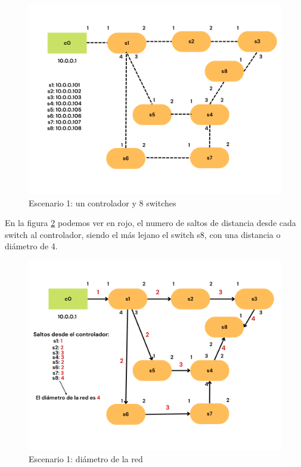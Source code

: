 \documentclass[a4paper, 12pt]{book}
\begin{document}
 	\vspace*{-18pt}
 	\begin{figure}[H]
 		\centering
 		\includegraphics[width=12cm, keepaspectratio]{img/escenario1-1}
 		\caption{Escenario 1: un controlador y 8 switches}
 		\label{figura:escenario1-1c}
 	\end{figure}
 	
 	En la figura \ref{figura:escenario1-explicado} podemos ver en rojo, el numero de saltos de distancia desde cada switch al controlador, siendo el más lejano el switch s8, con una distancia o diámetro de 4.
 	\begin{figure}[H]
 		\centering
 		\includegraphics[width=12cm, keepaspectratio]{img/escenario1-explicado}
 		\caption{Escenario 1: diámetro de la red}
 		\label{figura:escenario1-explicado}
 		\vspace{-18pt}
 	\end{figure}
 	
\end{document}
